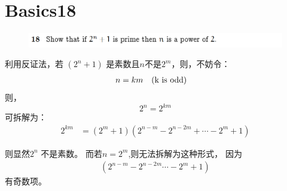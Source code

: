 \documentclass[]{article}
\begin{document}
\section*{Basics18}
\begin{figure}[H]
    \includegraphics[scale = 0.6]{2023-03-23-10-20-49.png}
\end{figure}
利用反证法，若 $(2^n +1)$ 是素数且$n$不是$2^m$，则，不妨令：
\begin{align}
    n &= km 
    \text{\quad (k is odd)}
\end{align}
则，
\begin{equation}
    2^n = 2^{km} 
\end{equation}
可拆解为：
\begin{align}
    2^{km} &= (2^m + 1) (2^{n-m} - 2^{n-2m} + \cdots - 2^{m} + 1 )
\end{align}

则显然$2^n$ 不是素数。
而若$n=2^m$,则无法拆解为这种形式，
因为
\begin{align}
    (2^{n-m} - 2^{n-2m}  \cdots - 2^{m} + 1) 
\end{align}
有奇数项。
\end{document}
